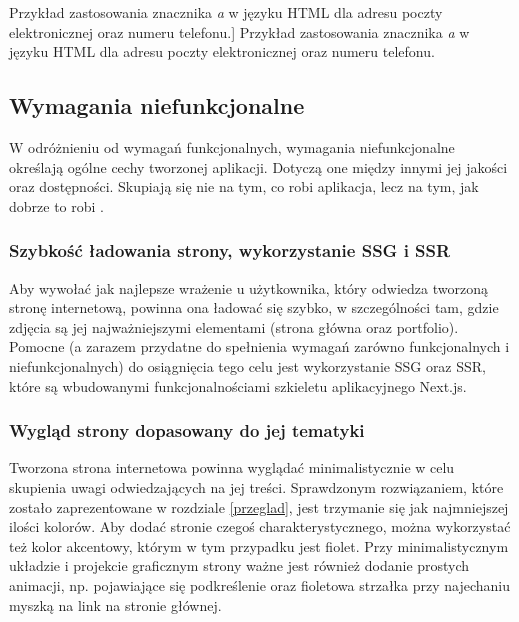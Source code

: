 \documentclass[a4paper, 12pt]{article}
\numberwithin{figure}{section}
\begin{document}
\begin{sloppypar}
\begin{code}[htbp]
    \vspace{0.5cm}
    
    \caption
    [Przykład zastosowania znacznika \textit{a} w języku HTML dla adresu poczty elektronicznej oraz numeru telefonu.]
    {Przykład zastosowania znacznika \textit{a} w języku HTML dla adresu poczty elektronicznej oraz numeru telefonu.}
    \label{chapter4:anchor}
\end{code}



\subsection{Wymagania niefunkcjonalne}

W odróżnieniu od wymagań funkcjonalnych, wymagania niefunkcjonalne określają ogólne cechy tworzonej aplikacji. Dotyczą one między innymi jej jakości oraz dostępności. Skupiają się nie na tym, co robi aplikacja, lecz na tym, jak dobrze to robi \cite{wymagania}. 

\subsubsection*{Szybkość ładowania strony, wykorzystanie SSG i SSR}

Aby wywołać jak najlepsze wrażenie u użytkownika, który odwiedza tworzoną stronę internetową, powinna ona ładować się szybko, w szczególności tam, gdzie zdjęcia są jej najważniejszymi elementami (strona główna oraz portfolio). Pomocne (a zarazem przydatne do spełnienia wymagań zarówno funkcjonalnych i niefunkcjonalnych) do osiągnięcia tego celu jest wykorzystanie SSG oraz SSR, które są wbudowanymi funkcjonalnościami szkieletu aplikacyjnego Next.js. 

\subsubsection*{Wygląd strony dopasowany do jej tematyki}

Tworzona strona internetowa powinna wyglądać minimalistycznie w celu skupienia uwagi odwiedzających na jej treści. Sprawdzonym rozwiązaniem, które zostało zaprezentowane w rozdziale \ref{przeglad}, jest trzymanie się jak najmniejszej ilości kolorów. Aby dodać stronie czegoś charakterystycznego, można wykorzystać też kolor akcentowy, którym w tym przypadku jest fiolet. Przy minimalistycznym układzie i projekcie graficznym strony ważne jest również dodanie prostych animacji, np. pojawiające się podkreślenie oraz fioletowa strzałka przy najechaniu myszką na link na stronie głównej. 


\end{sloppypar}
\end{document}
